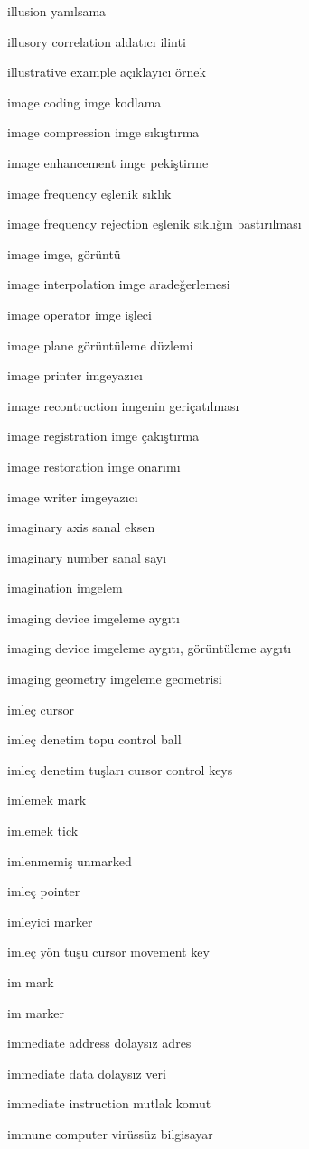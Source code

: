 \documentclass[12pt,fleqn]{article}\usepackage{../../common}
\begin{document}
illusion yanılsama

illusory correlation aldatıcı ilinti

illustrative example açıklayıcı örnek

image coding imge kodlama

image compression imge sıkıştırma

image enhancement imge pekiştirme

image frequency eşlenik sıklık

image frequency rejection eşlenik sıklığın bastırılması

image imge, görüntü

image interpolation imge aradeğerlemesi

image operator imge işleci

image plane görüntüleme düzlemi

image printer imgeyazıcı

image recontruction imgenin geriçatılması

image registration imge çakıştırma

image restoration imge onarımı

image writer imgeyazıcı

imaginary axis sanal eksen

imaginary number sanal sayı

imagination imgelem

imaging device imgeleme aygıtı

imaging device imgeleme aygıtı, görüntüleme aygıtı

imaging geometry imgeleme geometrisi

imleç cursor

imleç denetim topu control ball

imleç denetim tuşları cursor control keys

imlemek mark

imlemek tick

imlenmemiş unmarked

imleç pointer

imleyici marker

imleç yön tuşu cursor movement key

im mark

im marker

immediate address dolaysız adres

immediate data dolaysız veri

immediate instruction mutlak komut

immune computer virüssüz bilgisayar
\end{document}
